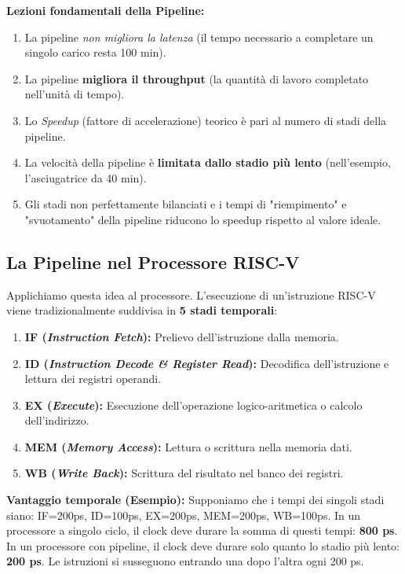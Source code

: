 \documentclass[12pt, a4paper]{article}
\begin{document}
\textbf{Lezioni fondamentali della Pipeline:}
\begin{enumerate}
    \item La pipeline \textit{non migliora la latenza} (il tempo necessario a completare un singolo carico resta 100 min).
    \item La pipeline \textbf{migliora il throughput} (la quantità di lavoro completato nell'unità di tempo).
    \item Lo \textit{Speedup} (fattore di accelerazione) teorico è pari al numero di stadi della pipeline.
    \item La velocità della pipeline è \textbf{limitata dallo stadio più lento} (nell'esempio, l'asciugatrice da 40 min).
    \item Gli stadi non perfettamente bilanciati e i tempi di "riempimento" e "svuotamento" della pipeline riducono lo speedup rispetto al valore ideale.
\end{enumerate}

\subsection{La Pipeline nel Processore RISC-V}
Applichiamo questa idea al processore. L'esecuzione di un'istruzione RISC-V viene tradizionalmente suddivisa in \textbf{5 stadi temporali}:
\begin{enumerate}
    \item \textbf{IF (\textit{Instruction Fetch}):} Prelievo dell'istruzione dalla memoria.
    \item \textbf{ID (\textit{Instruction Decode \& Register Read}):} Decodifica dell'istruzione e lettura dei registri operandi.
    \item \textbf{EX (\textit{Execute}):} Esecuzione dell'operazione logico-aritmetica o calcolo dell'indirizzo.
    \item \textbf{MEM (\textit{Memory Access}):} Lettura o scrittura nella memoria dati.
    \item \textbf{WB (\textit{Write Back}):} Scrittura del risultato nel banco dei registri.
\end{enumerate}

\textbf{Vantaggio temporale (Esempio):} 
Supponiamo che i tempi dei singoli stadi siano: IF=200ps, ID=100ps, EX=200ps, MEM=200ps, WB=100ps.
In un processore a singolo ciclo, il clock deve durare la somma di questi tempi: \textbf{800 ps}.
In un processore con pipeline, il clock deve durare solo quanto lo stadio più lento: \textbf{200 ps}. Le istruzioni si susseguono entrando una dopo l'altra ogni 200 ps.
\end{document}
